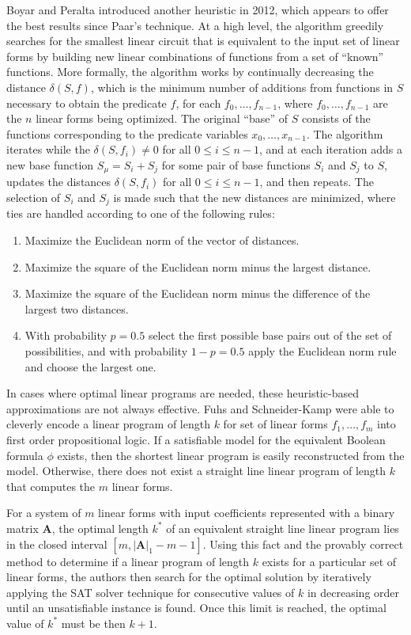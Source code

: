 Boyar and Peralta \cite{Boyar12-1} introduced another heuristic in 2012, which appears to offer the best results since Paar's technique. At a high level, the algorithm greedily searches for the smallest linear circuit that is equivalent to the input set of linear forms by building new linear combinations of functions from a set of ``known'' functions. More formally, the algorithm works by continually decreasing the distance $\delta(S, f)$, which is the minimum number of additions from functions in $S$ necessary to obtain the predicate $f$, for each $f_0,\dots,f_{n-1}$, where $f_0,\dots,f_{n-1}$ are the $n$ linear forms being optimized. The original ``base'' of $S$ consists of the functions corresponding to the predicate variables $x_0,\dots,x_{n-1}$. The algorithm iterates while the $\delta(S, f_i) \not= 0$ for all $0 \leq i \leq n-1$, and at each iteration adds a new base function $S_{\mu} = S_i + S_j$ for some pair of base functions $S_i$ and $S_j$ to $S$, updates the distances $\delta(S, f_i)$ for all $0 \leq i \leq n - 1$, and then repeats. The selection of $S_i$ and $S_j$ is made such that the new distances are minimized, where ties are handled according to one of the following rules:
\begin{enumerate}
	\item Maximize the Euclidean norm of the vector of distances.
	\item Maximize the square of the Euclidean norm minus the largest distance.
	\item Maximize the square of the Euclidean norm minus the difference of the largest two distances.
	\item With probability $p = 0.5$ select the first possible base pairs out of the set of possibilities, and with probability
	$1 - p = 0.5$ apply the Euclidean norm rule and choose the largest one.
\end{enumerate}

In cases where optimal linear programs are needed, these heuristic-based approximations are not always effective. Fuhs and Schneider-Kamp \cite{Fuhs10-1} were able to cleverly encode a linear program of length $k$ for set of linear forms $f_1,\dots,f_m$ into first order propositional logic. If a satisfiable model for the equivalent Boolean formula $\phi$ exists, then the shortest linear program is easily reconstructed from the model. Otherwise, there does not exist a straight line linear program of length $k$ that computes the $m$ linear forms. 

For a system of $m$ linear forms with input coefficients represented with a binary matrix $\mathbf{A}$, the optimal length $k^*$ of an equivalent straight line linear program lies in the closed interval $[m, |\mathbf{A}|_1 - m - 1]$. Using this fact and the provably correct method to determine if a linear program of length $k$ exists for a particular set of linear forms, the authors then search for the optimal solution by iteratively applying the SAT solver technique for consecutive values of $k$ in decreasing order until an unsatisfiable instance is found. Once this limit is reached, the optimal value of $k^*$ must be then $k + 1$.

